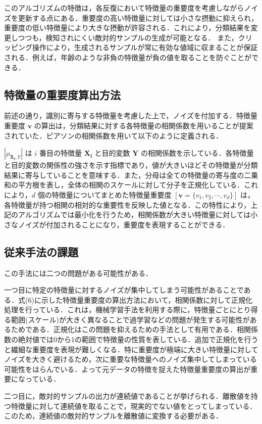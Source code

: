 このアルゴリズムの特徴は，各反復において特徴量の重要度を考慮しながらノイズを更新する点にある．重要度の高い特徴量に対しては小さな摂動に抑えられ，重要度の低い特徴量により大きな摂動が許容される．これにより，分類結果を変更しつつも，検知されにくい敵対的サンプルの生成が可能となる．
また，クリッピング操作により，生成されるサンプルが常に有効な値域に収まることが保証される．例えば，年齢のような非負の特徴量が負の値を取ることを防ぐことができる．


\subsection{特徴量の重要度算出方法}

前述の通り，識別に寄与する特徴量を考慮した上で，ノイズを付加する．特徴量重要度 $\bm{v}$ の算出は，分類結果に対する各特徴量の相関係数を用いることが提案されていた．ピアソンの相関係数を用いて以下のように定義される．

$|\rho_{\bm{X_i},Y}|$ は $i$ 番目の特徴量 $\bm{X_i}$ と目的変数 $\bm{Y}$ の相関係数を示している．各特徴量と目的変数の関係性の強さを示す指標であり，値が大きいほどその特徴量が分類結果に寄与していることを意味する．また，分母は全ての特徴量の寄与度の二乗和の平方根を表し，全体の相関のスケールに対して分子を正規化している．これにより，$d$ 個の特徴量についてまとめた特徴量重要度 $[ \bm{v} = \{v_1, v_2, \cdots, v_d\} ]$ は，各特徴量が持つ相関の相対的な重要性を反映した値となる．この特性により，上記のアルゴリズムでは最小化を行うため，相関係数が大きい特徴量に対しては小さなノイズが付加されることになり，重要度を表現することができる．



\subsection{従来手法の課題}

この手法には二つの問題がある可能性がある．

一つ目に特定の特徴量に対するノイズが集中してしまう可能性があることである．式(6)に示した特徴量重要度の算出方法において，相関係数に対して正規化処理を行っている．これは，機械学習手法を利用する際に，特徴量ごとにとり得る範囲(スケール)が大きく異なることで過学習などの問題が発生する可能性があるためである．正規化はこの問題を抑えるための手法として有用である．\cite{LawOfAwesomeDataScientist}相関係数の絶対値では0から1の範囲で特徴量の性質を表している．追加で正規化を行うと繊細な重要度を表現が難しくなる．特に重要度が極端に大きい特徴量に対してノイズを大きく避けるため，次に重要な特徴量へのノイズ集中してしまっている可能性をはらんでいる．よって元データの特徴を捉えた特徴量重要度の算出が重要になっている．

二つ目に，敵対的サンプルの出力が連続値であることが挙げられる．離散値を持つ特徴量に対して連続値を取ることで，現実的でない値をとってしまっている．このため，連続値の敵対的サンプルを離散値に変換する必要がある．
